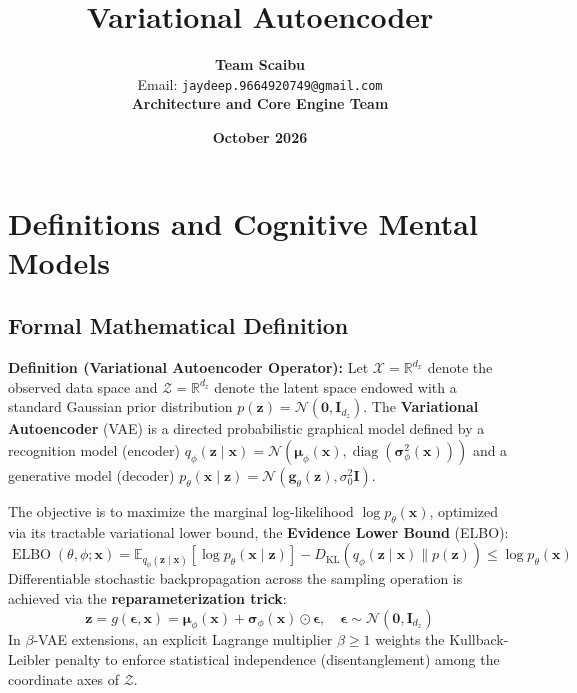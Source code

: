 \documentclass[11pt,a4paper]{article}
\title{\textbf{Variational Autoencoder}}
\author{\textbf{Team Scaibu} \\ \small Email: \texttt{jaydeep.9664920749@gmail.com} \\ \small \textbf{Architecture and Core Engine Team}}
\date{\textbf{October 2026}}
\theoremstyle{definition}
\begin{document}
\maketitle

\section{Definitions and Cognitive Mental Models}

\subsection{Formal Mathematical Definition}
\textbf{Definition (Variational Autoencoder Operator):}
Let $\mathcal{X} = \mathbb{R}^{d_x}$ denote the observed data space and $\mathcal{Z} = \mathbb{R}^{d_z}$ denote the latent space endowed with a standard Gaussian prior distribution $p(\mathbf{z}) = \mathcal{N}(\mathbf{0}, \mathbf{I}_{d_z})$. The \textbf{Variational Autoencoder} (VAE) is a directed probabilistic graphical model defined by a recognition model (encoder) $q_\phi(\mathbf{z} \mid \mathbf{x}) = \mathcal{N}(\boldsymbol{\mu}_\phi(\mathbf{x}), \operatorname{diag}(\boldsymbol{\sigma}_\phi^2(\mathbf{x})))$ and a generative model (decoder) $p_\theta(\mathbf{x} \mid \mathbf{z}) = \mathcal{N}(\mathbf{g}_\theta(\mathbf{z}), \sigma_0^2 \mathbf{I})$.

The objective is to maximize the marginal log-likelihood $\log p_\theta(\mathbf{x})$, optimized via its tractable variational lower bound, the \textbf{Evidence Lower Bound} (ELBO):
{\boldmath
\begin{equation}
\operatorname{ELBO}(\theta, \phi; \mathbf{x}) = \mathbb{E}_{q_\phi(\mathbf{z} \mid \mathbf{x})}\left[ \log p_\theta(\mathbf{x} \mid \mathbf{z}) \right] - D_{\text{KL}}\left( q_\phi(\mathbf{z} \mid \mathbf{x}) \parallel p(\mathbf{z}) \right) \le \log p_\theta(\mathbf{x})
\end{equation}
}
Differentiable stochastic backpropagation across the sampling operation is achieved via the \textbf{reparameterization trick}:
{\boldmath
\begin{equation}
\mathbf{z} = g(\boldsymbol{\epsilon}, \mathbf{x}) = \boldsymbol{\mu}_\phi(\mathbf{x}) + \boldsymbol{\sigma}_\phi(\mathbf{x}) \odot \boldsymbol{\epsilon}, \quad \boldsymbol{\epsilon} \sim \mathcal{N}(\mathbf{0}, \mathbf{I}_{d_z})
\end{equation}
}
In $\beta$-VAE extensions, an explicit Lagrange multiplier $\beta \ge 1$ weights the Kullback-Leibler penalty to enforce statistical independence (disentanglement) among the coordinate axes of $\mathcal{Z}$.
\end{document}
